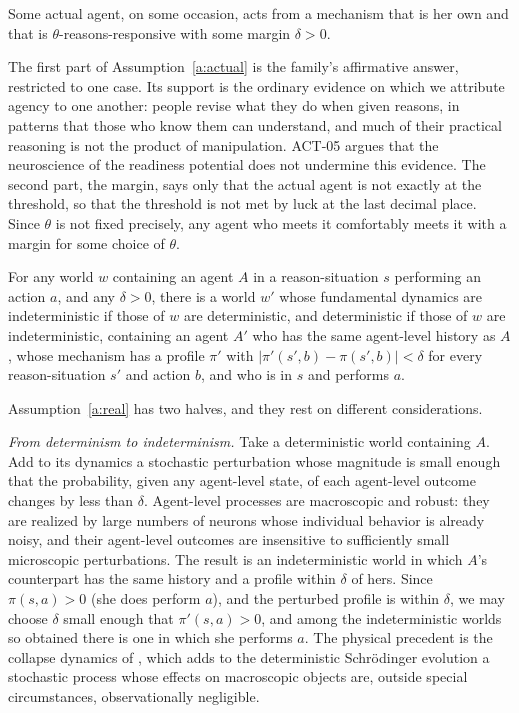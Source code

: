 \documentclass{situationist-preprint}
\begin{document}
\begin{assumption}\label{a:actual}
Some actual agent, on some occasion, acts from a mechanism that is her own and that is $\theta$-reasons-responsive with some margin $\delta > 0$.
\end{assumption}

The first part of Assumption~\ref{a:actual} is the family's affirmative answer, restricted to one case. Its support is the ordinary evidence on which we attribute agency to one another: people revise what they do when given reasons, in patterns that those who know them can understand, and much of their practical reasoning is not the product of manipulation. ACT-05 argues that the neuroscience of the readiness potential does not undermine this evidence. The second part, the margin, says only that the actual agent is not exactly at the threshold, so that the threshold is not met by luck at the last decimal place. Since $\theta$ is not fixed precisely, any agent who meets it comfortably meets it with a margin for some choice of $\theta$.

\begin{assumption}\label{a:real}
For any world $w$ containing an agent $A$ in a reason-situation $s$ performing an action $a$, and any $\delta > 0$, there is a world $w'$ whose fundamental dynamics are indeterministic if those of $w$ are deterministic, and deterministic if those of $w$ are indeterministic, containing an agent $A'$ who has the same agent-level history as $A$, whose mechanism has a profile $\pi'$ with $|\pi'(s',b) - \pi(s',b)| < \delta$ for every reason-situation $s'$ and action $b$, and who is in $s$ and performs $a$.
\end{assumption}

Assumption~\ref{a:real} has two halves, and they rest on different considerations.

\emph{From determinism to indeterminism.} Take a deterministic world containing $A$. Add to its dynamics a stochastic perturbation whose magnitude is small enough that the probability, given any agent-level state, of each agent-level outcome changes by less than $\delta$. Agent-level processes are macroscopic and robust: they are realized by large numbers of neurons whose individual behavior is already noisy, and their agent-level outcomes are insensitive to sufficiently small microscopic perturbations. The result is an indeterministic world in which $A$'s counterpart has the same history and a profile within $\delta$ of hers. Since $\pi(s,a) > 0$ (she does perform $a$), and the perturbed profile is within $\delta$, we may choose $\delta$ small enough that $\pi'(s,a) > 0$, and among the indeterministic worlds so obtained there is one in which she performs $a$. The physical precedent is the collapse dynamics of \citet{GRW1986}, which adds to the deterministic Schr\"odinger evolution a stochastic process whose effects on macroscopic objects are, outside special circumstances, observationally negligible.
\end{document}
